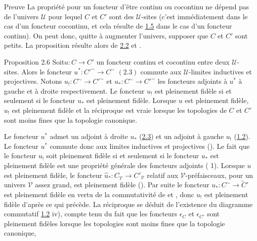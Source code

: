 \documentclass[10pt]{../fichiers-configuration-latex/smfart}
\begin{document}
\begin{enonce*}[remark]{Preuve}
La propriété pour un foncteur d'être continu ou cocontinu ne
dépend pas de l'univers $𝒰$ pour lequel $C$ et $C'$ sont des
$𝒰$-sites (c'est immédiatement dans le cas d'un foncteur
cocontinu, et cela résulte de \hyperref[III.prop1.5]{1.5} dans le cas d'un
foncteur continu). On peut donc, quitte à augmenter l'univers,
supposer que $C$ et $C'$ sont petits. La proposition résulte alors
de \hyperref[III.prop2.2]{2.2} et .
\end{enonce*}

\begin{enonce*}{Proposition 2.6}
Soit\pageoriginale $u:C\rightarrow C'$ un foncteur continu et
cocontinu entre deux $𝒰$-sites. Alors le foncteur
$u^{\ast}:{C'}^{\sim}\rightarrow C^{\sim}$ $(\hyperref[III.prop2.3]{2.3})$
commute aux $𝒰$-limites inductives et projectives. Notons
$u_{!}:C^{\sim}\rightarrow {C'}^{\sim}$ et
$u_{\ast}:C^{\sim}\rightarrow {C'}^{\sim}$ les foncteurs adjoints à
$u^{\ast}$ à gauche et à droite respectivement. Le foncteur $u_{!}$
est pleinement fidèle si et seulement si le foncteur $u_{\ast}$ est
pleinement fidèle. Lorsque $u$ est pleinement fidèle, $u_{!}$ est
pleinement fidèle et la réciproque est vraie lorsque les topologies
de $C$ et $C'$ sont moins fines que la topologie canonique.
\end{enonce*}

Le foncteur $u^{\ast}$ admet un adjoint à droite $u_{\ast}$
(\hyperref[III.prop2.3]{2.3}) et un adjoint à gauche $u_{!}$
(\hyperref[III.prop1.2]{1.2}). Le foncteur $u^{\ast}$ commute donc aux limites
inductives et projectives (). Le fait que le
foncteur $u_{!}$ soit pleinement fidèle si et seulement si le
foncteur $u_{\ast}$ est pleinement fidèle est une
propriété générale des foncteurs adjoints
( 1). Lorsque $u$ est pleinement fidèle, le foncteur
$\widehat{u}_{\ast}:C^{\widehat{\phantom{,}}}_{𝒱}\rightarrow
{C'}^{\widehat{\phantom{,}}}_{𝒱}$ relatif aux
$𝒱$-préfaisceaux, pour un univers $𝒱$ assez
grand, est pleinement fidèle (). Par suite le
foncteur $u_{\ast}:C^{\sim}\rightarrow \widetilde{C}'$ est
pleinement fidèle en vertu de la commutativité de
 et , donc $u_{!}$ est pleinement
fidèle d'après ce qui précède. La réciproque se
déduit de l'existence du diagramme commutatif \hyperref[III.prop1.2]{1.2}
iv), compte tenu du fait que les foncteurs $\epsilon_C$ et
$\epsilon_{C'}$ sont pleinement fidèles lorsque les topologies
sont moins fines que la topologie canonique, \cqfd
\end{document}
